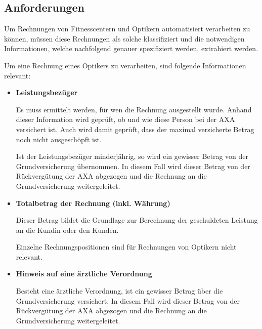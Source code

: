 \subsection{Anforderungen}
\label{chap:requirements}

Um Rechnungen von Fitnesscentern und Optikern automatisiert verarbeiten zu können, müssen diese Rechnungen als solche klassifiziert und die notwendigen Informationen, welche nachfolgend genauer spezifiziert werden, extrahiert werden.

Um eine Rechnung eines Optikers zu verarbeiten, sind folgende Informationen relevant:

\nopagebreak
\begin{itemize}
    \item \textbf{Leistungsbezüger}
    
    Es muss ermittelt werden, für wen die Rechnung ausgestellt wurde. Anhand dieser Information wird geprüft, ob und wie diese Person bei der AXA versichert ist. Auch wird damit geprüft, dass der maximal versicherte Betrag noch nicht ausgeschöpft ist.
    
    Ist der Leistungsbezüger minderjährig, so wird ein gewisser Betrag von der Grundversicherung übernommen. In diesem Fall wird dieser Betrag von der Rückvergütung der AXA abgezogen und die Rechnung an die Grundversicherung weitergeleitet.
    
    \item \textbf{Totalbetrag der Rechnung (inkl. Währung)}
    
    Dieser Betrag bildet die Grundlage zur Berechnung der geschuldeten Leistung an die Kundin oder den Kunden. 
    
    Einzelne Rechnungspositionen sind für Rechnungen von Optikern nicht relevant.
    
    \item \textbf{Hinweis auf eine ärztliche Verordnung}
    
    Besteht eine ärztliche Verordnung, ist ein gewisser Betrag über die Grundversicherung versichert. In diesem Fall wird dieser Betrag von der Rückvergütung der AXA abgezogen und die Rechnung an die Grundversicherung weitergeleitet.
\end{itemize}



